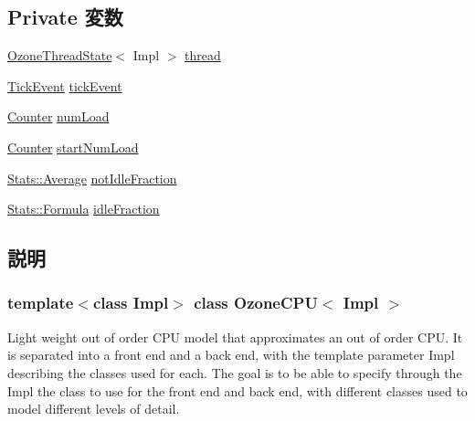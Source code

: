 \subsection*{Private 変数}
\begin{DoxyCompactItemize}
\item 
\hyperlink{structOzoneThreadState}{OzoneThreadState}$<$ Impl $>$ \hyperlink{classOzoneCPU_a46c1be14c8c6673c367ce5c278305858}{thread}
\item 
\hyperlink{structOzoneCPU_1_1TickEvent}{TickEvent} \hyperlink{classOzoneCPU_aa36b8e894416f0ec98f701ab08f2ac22}{tickEvent}
\item 
\hyperlink{base_2types_8hh_ae1475755791765b8e6f6a8bb091e273e}{Counter} \hyperlink{classOzoneCPU_a9c78b70028e5df92b15a6fd9c56e5acf}{numLoad}
\item 
\hyperlink{base_2types_8hh_ae1475755791765b8e6f6a8bb091e273e}{Counter} \hyperlink{classOzoneCPU_abc2dac603f413be8cd5f63b5c0b2d48d}{startNumLoad}
\item 
\hyperlink{classStats_1_1Average}{Stats::Average} \hyperlink{classOzoneCPU_a40be38a691cf502b6ba46aaefd86dc77}{notIdleFraction}
\item 
\hyperlink{classStats_1_1Formula}{Stats::Formula} \hyperlink{classOzoneCPU_a591131fa4ec30e59631a01f16393430e}{idleFraction}
\end{DoxyCompactItemize}


\subsection{説明}
\subsubsection*{template$<$class Impl$>$ class OzoneCPU$<$ Impl $>$}

Light weight out of order CPU model that approximates an out of order CPU. It is separated into a front end and a back end, with the template parameter Impl describing the classes used for each. The goal is to be able to specify through the Impl the class to use for the front end and back end, with different classes used to model different levels of detail. 

